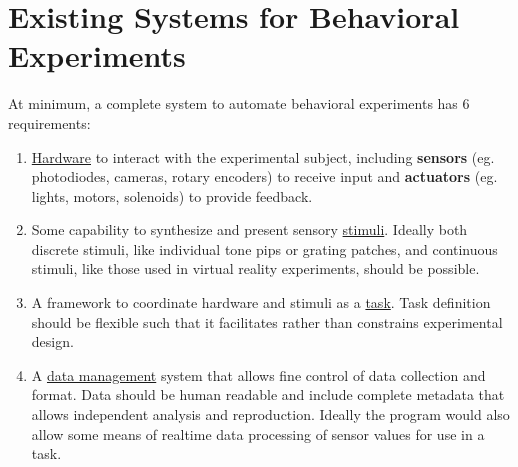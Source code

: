 \section{Existing Systems for Behavioral Experiments}
\label{sec:existing}

At minimum, a complete system to automate behavioral experiments has 6 requirements:

\begin{enumerate}

\item \hyperref[sec:hardware]{Hardware} to interact with the experimental subject, including \textbf{sensors} (eg. photodiodes, cameras, rotary encoders) to receive input and \textbf{actuators} (eg. lights, motors, solenoids) to provide feedback.
\item Some capability to synthesize and present sensory \hyperref[sec:stim]{stimuli}. Ideally both discrete stimuli, like individual tone pips or grating patches, and continuous stimuli, like those used in virtual reality experiments, should be possible.
\item A  framework to coordinate hardware and stimuli as a \hyperref[sec:tasks]{task}. Task definition should be flexible such that it facilitates rather than constrains experimental design.
\item A \hyperref[sec:data]{data management} system that allows fine control of data collection and format. Data should be human readable and include complete metadata that allows independent analysis and reproduction. Ideally the program would also allow some means of realtime data processing of sensor values for use in a task.

\end{enumerate}
